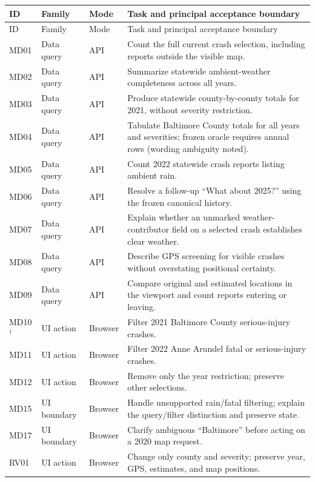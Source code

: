 \begin{longtable}{@{}p{}p{}p{}p{}@{}}
\toprule ID & Family & Mode & Task and principal acceptance boundary\\\midrule\endfirsthead
\toprule ID & Family & Mode & Task and principal acceptance boundary\\\midrule\endhead
MD01 & Data query & API & Count the full current crash selection, including reports outside the visible map.\\
MD02 & Data query & API & Summarize statewide ambient-weather completeness across all years.\\
MD03 & Data query & API & Produce statewide county-by-county totals for 2021, without severity restriction.\\
MD04 & Data query & API & Tabulate Baltimore County totals for all years and severities; frozen oracle requires annual rows (wording ambiguity noted).\\
MD05 & Data query & API & Count 2022 statewide crash reports listing ambient rain.\\
MD06 & Data query & API & Resolve a follow-up ``What about 2025?'' using the frozen canonical history.\\
MD07 & Data query & API & Explain whether an unmarked weather-contributor field on a selected crash establishes clear weather.\\
MD08 & Data query & API & Describe GPS screening for visible crashes without overstating positional certainty.\\
MD09 & Data query & API & Compare original and estimated locations in the viewport and count reports entering or leaving.\\
MD10$^{\dagger}$ & UI action & Browser & Filter 2021 Baltimore County serious-injury crashes.\\
MD11 & UI action & Browser & Filter 2022 Anne Arundel fatal or serious-injury crashes.\\
MD12 & UI action & Browser & Remove only the year restriction; preserve other selections.\\
MD15 & UI boundary & Browser & Handle unsupported rain/fatal filtering; explain the query/filter distinction and preserve state.\\
MD17 & UI boundary & Browser & Clarify ambiguous ``Baltimore'' before acting on a 2020 map request.\\
RV01 & UI action & Browser & Change only county and severity; preserve year, GPS, estimates, and map positions.\\

\end{longtable}
